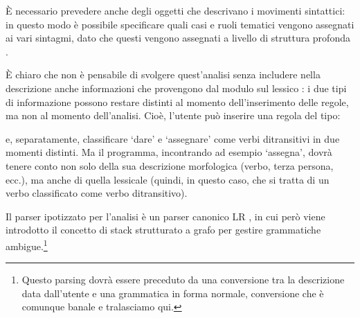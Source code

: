 \documentclass[twoside,stylearticle,11pt,filologia,it,article,bibsection]{spinoza}
\begin{document}
È necessario prevedere anche degli oggetti che descrivano i movimenti
sintattici: in questo modo è possibile specificare quali casi e ruoli
tematici vengono assegnati ai vari sintagmi, dato che questi vengono
assegnati a livello di struttura profonda .

È chiaro che non è pensabile di svolgere quest'analisi senza includere
nella descrizione anche informazioni che provengono dal modulo sul
lessico : i due tipi di informazione
possono restare distinti al momento dell'inserimento delle regole, ma
non al momento dell'analisi. Cioè, l'utente può inserire una regola del tipo:

\begin{lingeq}\label{eq:xbares}
\end{lingeq}
\noindent e, separatamente, classificare `dare' e `assegnare' come
verbi ditransitivi in due momenti distinti. Ma il programma, incontrando
ad esempio `assegna', dovrà tenere conto non solo della sua
descrizione morfologica (verbo, terza persona, ecc.), ma anche di
quella lessicale (quindi, in questo caso, che si tratta di un verbo
classificato come verbo ditransitivo).

Il parser ipotizzato per l'analisi è un parser canonico LR
, in cui però viene introdotto il
concetto di stack strutturato a grafo
 per gestire grammatiche
ambigue.\footnote{Questo parsing dovrà essere preceduto da una
  conversione tra la descrizione data dall'utente e una grammatica in
  forma normale, conversione che è comunque banale e tralasciamo qui.} 
\end{document}
